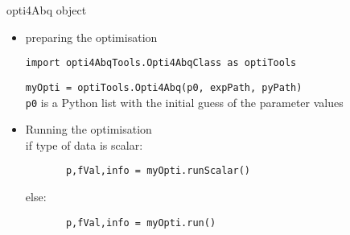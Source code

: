 \begin{frame}[fragile]{opti4Abq object}
\begin{itemize}
\item preparing the optimisation

\verb|import opti4AbqTools.Opti4AbqClass as optiTools|

\verb|myOpti = optiTools.Opti4Abq(p0, expPath, pyPath)|\\[5pt]

\verb|p0| is a Python list with the initial guess of the parameter values

\item Running the optimisation\\[5pt]

if type of data is scalar:
\begin{verbatim}
       p,fVal,info = myOpti.runScalar()
\end{verbatim}
else:
\begin{verbatim}
       p,fVal,info = myOpti.run()
\end{verbatim}
\end{itemize}
\end{frame}


